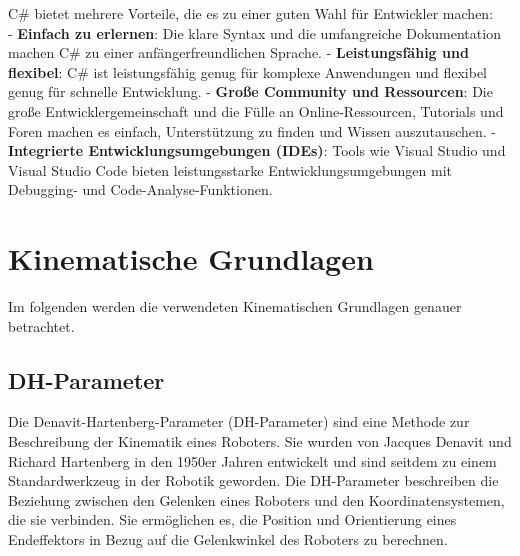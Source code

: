 C\# bietet mehrere Vorteile, die es zu einer guten Wahl für Entwickler machen:
\\

\noindent
- \textbf{Einfach zu erlernen}: Die klare Syntax und die umfangreiche Dokumentation machen C\# zu einer anfängerfreundlichen Sprache.
\newline
- \textbf{Leistungsfähig und flexibel}: C\# ist leistungsfähig genug für komplexe Anwendungen und flexibel genug für schnelle Entwicklung.
\newline
- \textbf{Große Community und Ressourcen}: Die große Entwicklergemeinschaft und die Fülle an Online-Ressourcen, Tutorials und Foren machen es einfach, Unterstützung zu finden und Wissen auszutauschen.
\newline
- \textbf{Integrierte Entwicklungsumgebungen (IDEs)}: Tools wie Visual Studio und Visual Studio Code bieten leistungsstarke Entwicklungsumgebungen mit Debugging- und Code-Analyse-Funktionen.

\section{Kinematische Grundlagen}\label{sec:KinematischeGrundlagen}
Im folgenden werden die verwendeten Kinematischen Grundlagen genauer betrachtet.
\subsection{DH-Parameter}\label{subsec:DHParameter}
Die Denavit-Hartenberg-Parameter (DH-Parameter) sind eine Methode zur Beschreibung der Kinematik eines Roboters. Sie wurden von Jacques Denavit und Richard Hartenberg in den 1950er Jahren entwickelt und sind seitdem zu einem Standardwerkzeug in der Robotik geworden. Die DH-Parameter beschreiben die Beziehung zwischen den Gelenken eines Roboters und den Koordinatensystemen, die sie verbinden. Sie ermöglichen es, die Position und Orientierung eines Endeffektors in Bezug auf die Gelenkwinkel des Roboters zu berechnen.
\\

